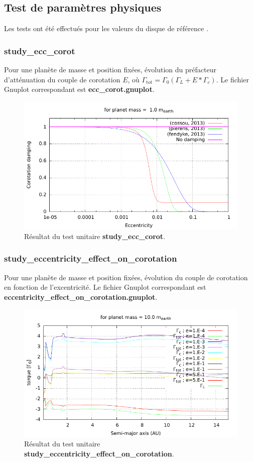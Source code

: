 \subsection{Test de paramètres physiques}
Les tests ont été effectués pour les valeurs du disque de référence .

\subsubsection{study\_ecc\_corot}
Pour une planète de masse et position fixées, évolution du préfacteur d'atténuation du couple de corotation $E$, où
$\Gamma_\text{tot}=\Gamma_0 (\Gamma_L + E * \Gamma_c)$. Le fichier Gnuplot correspondant est \textbf{ecc\_corot.gnuplot}. 

\begin{figure}[htbp]
\centering
\includegraphics[width=0.65\linewidth]{figure/unitary_tests/ecc_corot.pdf}
\caption{Résultat du test unitaire \textbf{study\_ecc\_corot}.}
\end{figure}

\subsubsection{study\_eccentricity\_effect\_on\_corotation}
Pour une planète de masse et position fixées, évolution du couple de corotation en fonction de l'excentricité. Le fichier
Gnuplot correspondant est \textbf{eccentricity\_effect\_on\_corotation.gnuplot}. 

\begin{figure}[htbp]
\centering
\includegraphics[width=0.65\linewidth]{figure/unitary_tests/eccentricity_effect_on_corotation.pdf}
\caption{Résultat du test unitaire \textbf{study\_eccentricity\_effect\_on\_corotation}.}
\end{figure}

